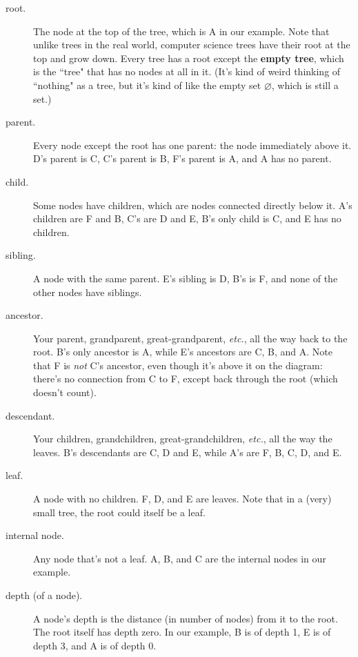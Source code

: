 \begin{description}
\item[root.] The node at the top of the tree, which is A in our example.
Note that unlike trees in the real world, computer science trees have their
root at the top and grow down. Every tree has a root except the
\textbf{empty tree}, which is the ``tree" that has no nodes at all in it.
(It's kind of weird thinking of ``nothing" as a tree, but it's kind of like
the empty set $\varnothing$, which is still a set.) 

\item[parent.] Every node except the root has one parent: the node
immediately above it. D's parent is C, C's parent is B, F's parent is A,
and A has no parent.

\item[child.] Some nodes have children, which are nodes connected directly
below it. A's children are F and B, C's are D and E, B's only child is C,
and E has no children.

\item[sibling.] A node with the same parent. E's sibling is D, B's is F,
and none of the other nodes have siblings.

\item[ancestor.] Your parent, grandparent, great-grandparent,
\textit{etc.}, all the way back to the root. B's only ancestor is A, while
E's ancestors are C, B, and A. Note that F is \textit{not} C's ancestor,
even though it's above it on the diagram: there's no connection from C to
F, except back through the root (which doesn't count).

\item[descendant.] Your children, grandchildren, great-grandchildren,
\textit{etc.}, all the way the leaves. B's descendants are C, D and E,
while A's are F, B, C, D, and E. 

\item[leaf.] A node with no children. F, D, and E are leaves. Note that in
a (very) small tree, the root could itself be a leaf.

\item[internal node.] Any node that's not a leaf. A, B, and C are the
internal nodes in our example.

\item[depth (of a node).] A node's depth is the distance (in number of
nodes) from it to the root. The root itself has depth zero. In our example,
B is of depth 1, E is of depth 3, and A is of depth 0.


\end{description}
